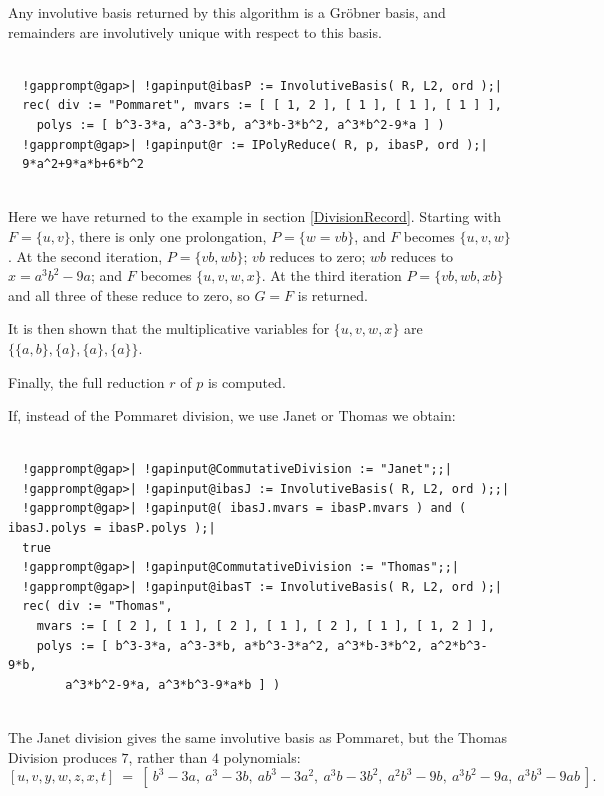 \documentclass[a4paper,11pt]{report}
\begin{document}
{{{ Any involutive basis returned by this algorithm is a Gr{\"o}bner basis, and
remainders are involutively unique with respect to this basis. 

 }

 
\begin{Verbatim}[commandchars=!@|,fontsize=\small,frame=single,label=Example]
  
  !gapprompt@gap>| !gapinput@ibasP := InvolutiveBasis( R, L2, ord );|
  rec( div := "Pommaret", mvars := [ [ 1, 2 ], [ 1 ], [ 1 ], [ 1 ] ], 
    polys := [ b^3-3*a, a^3-3*b, a^3*b-3*b^2, a^3*b^2-9*a ] )
  !gapprompt@gap>| !gapinput@r := IPolyReduce( R, p, ibasP, ord );|
  9*a^2+9*a*b+6*b^2
  
\end{Verbatim}
 Here we have returned to the example in section \ref{DivisionRecord}. Starting with $F=\{u,v\}$, there is only one prolongation, $P=\{w=vb\}$, and $F$ becomes $\{u,v,w\}$. At the second iteration, $P=\{vb,wb\}$; $vb$ reduces to zero; $wb$ reduces to $x=a^3b^2-9a$; and $F$ becomes $\{u,v,w,x\}$. At the third iteration $P=\{vb,wb,xb\}$ and all three of these reduce to zero, so $G = F$ is returned. 

 It is then shown that the multiplicative variables for $\{u,v,w,x\}$ are $\{\{a,b\},\{a\},\{a\},\{a\}\}$. 

 Finally, the full reduction $r$ of $p$ is computed. 

 If, instead of the Pommaret division, we use Janet or Thomas we obtain: 

 
\begin{Verbatim}[commandchars=!@|,fontsize=\small,frame=single,label=Example]
  
  !gapprompt@gap>| !gapinput@CommutativeDivision := "Janet";;|
  !gapprompt@gap>| !gapinput@ibasJ := InvolutiveBasis( R, L2, ord );;|
  !gapprompt@gap>| !gapinput@( ibasJ.mvars = ibasP.mvars ) and ( ibasJ.polys = ibasP.polys );|
  true
  !gapprompt@gap>| !gapinput@CommutativeDivision := "Thomas";;|
  !gapprompt@gap>| !gapinput@ibasT := InvolutiveBasis( R, L2, ord );|
  rec( div := "Thomas", 
    mvars := [ [ 2 ], [ 1 ], [ 2 ], [ 1 ], [ 2 ], [ 1 ], [ 1, 2 ] ], 
    polys := [ b^3-3*a, a^3-3*b, a*b^3-3*a^2, a^3*b-3*b^2, a^2*b^3-9*b, 
        a^3*b^2-9*a, a^3*b^3-9*a*b ] )
  
\end{Verbatim}
 The Janet division gives the same involutive basis as Pommaret, but the Thomas
Division produces $7$, rather than $4$ polynomials: 
\[ [u,v,y,w,z,x,t] ~=~ [~ b^3-3a,\ a^3-3b,\ ab^3-3a^2,\ a^3b-3b^2,\ a^2b^3-9b,\
a^3b^2-9a,\ a^3b^3-9ab ~]. \]
 

}}
\end{document}
